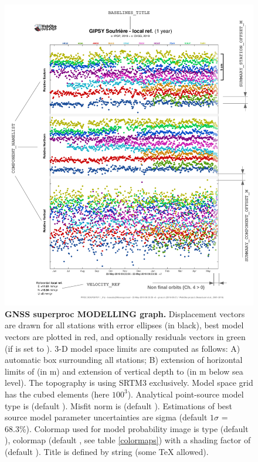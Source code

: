 \begin{figure}
\centering
\includegraphics[width=\textwidth,page=5]{figures/gnss_superproc.pdf}
\caption{\textbf{GNSS superproc MODELLING graph.} Displacement vectors are drawn for all stations with error ellipses (in black), best model vectors are plotted in red, and optionally residuals vectors in green (if  is set to ). 3-D model space limits are computed as follows: A) automatic box surrounding all stations; B) extension of horizontal limits of  (in m) and extension of vertical depth to  (in m below sea level). The topography is using SRTM3 exclusively. Model space grid has the cubed  elements (here $100^3$). Analytical point-source model type is  (default ). Misfit norm is  (default ). Estimations of best source model parameter uncertainties are  sigma (default $1\sigma$ = 68.3\%). Colormap used for model probability image is  type (default ),  colormap (default , see table \ref{colormaps}) with a shading factor of  (default ). Title is defined by  string (some TeX allowed). }
\label{gnss_modelling}
\end{figure}

